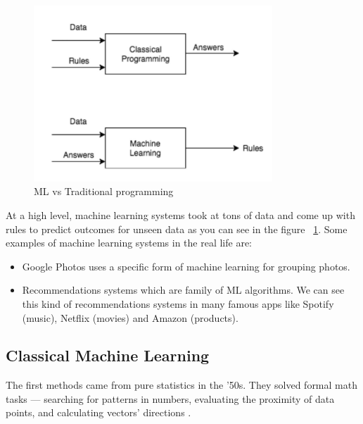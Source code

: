 \begin{figure}[H]
\centering
\includegraphics[width=0.8\textwidth]{./figures/ml-structure}
\caption{ML vs Traditional programming}
\label{fig:classicalvsmachinelearning}
\end{figure}

At a high level, machine learning systems took at tons of data and come up with rules to predict outcomes for unseen data as you can see in the figure ~\ref{fig:classicalvsmachinelearning}. 
Some examples of machine learning systems in the real life are:

\begin{itemize}
\item Google Photos uses a specific form of machine learning for grouping photos.
\item Recommendations systems which are family of ML algorithms. We can see this kind of recommendations systems in many famous apps like Spotify (music), Netflix (movies) and Amazon (products).
\end{itemize}


\subsection[Classical Machine Learning]{Classical Machine Learning}

The first methods came from pure statistics in the '50s. They solved formal math tasks — searching for patterns in numbers, evaluating the proximity of data points, and calculating vectors' directions \cite{classicalmachinelearning}.

